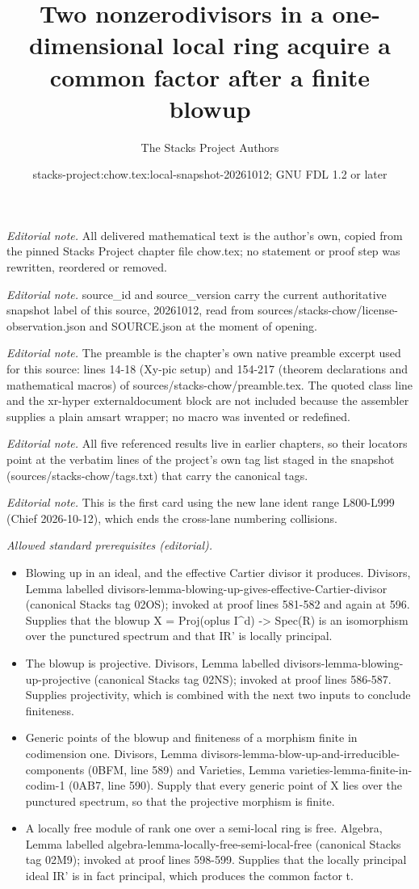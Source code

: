 \documentclass[10pt,a4paper]{amsart}
\title{Two nonzerodivisors in a one-dimensional local ring acquire a common factor after a finite blowup}
\author{The Stacks Project Authors}
\date{stacks-project:chow.tex:local-snapshot-20261012; GNU FDL 1.2 or later}
\theoremstyle{plain}
\theoremstyle{definition}
\theoremstyle{remark}
\numberwithin{equation}{subsection}
\begin{document}
\maketitle
\noindent\textit{Editorial note.} All delivered mathematical text is the author's own, copied from the pinned Stacks Project chapter file chow.tex; no statement or proof step was rewritten, reordered or removed.\par\medskip
\noindent\textit{Editorial note.} source\_id and source\_version carry the current authoritative snapshot label of this source, 20261012, read from sources/stacks-chow/license-observation.json and SOURCE.json at the moment of opening.\par\medskip
\noindent\textit{Editorial note.} The preamble is the chapter's own native preamble excerpt used for this source: lines 14-18 (Xy-pic setup) and 154-217 (theorem declarations and mathematical macros) of sources/stacks-chow/preamble.tex. The quoted class line and the xr-hyper externaldocument block are not included because the assembler supplies a plain amsart wrapper; no macro was invented or redefined.\par\medskip
\noindent\textit{Editorial note.} All five referenced results live in earlier chapters, so their locators point at the verbatim lines of the project's own tag list staged in the snapshot (sources/stacks-chow/tags.txt) that carry the canonical tags.\par\medskip
\noindent\textit{Editorial note.} This is the first card using the new lane ident range L800-L999 (Chief 2026-10-12), which ends the cross-lane numbering collisions.\par\medskip
\noindent\textit{Allowed standard prerequisites (editorial).}\begin{itemize}
\item Blowing up in an ideal, and the effective Cartier divisor it produces. Divisors, Lemma labelled divisors-lemma-blowing-up-gives-effective-Cartier-divisor (canonical Stacks tag 02OS); invoked at proof lines 581-582 and again at 596. Supplies that the blowup X = Proj(oplus I\textasciicircum{}d) -> Spec(R) is an isomorphism over the punctured spectrum and that IR' is locally principal.
\item The blowup is projective. Divisors, Lemma labelled divisors-lemma-blowing-up-projective (canonical Stacks tag 02NS); invoked at proof lines 586-587. Supplies projectivity, which is combined with the next two inputs to conclude finiteness.
\item Generic points of the blowup and finiteness of a morphism finite in codimension one. Divisors, Lemma divisors-lemma-blow-up-and-irreducible-components (0BFM, line 589) and Varieties, Lemma varieties-lemma-finite-in-codim-1 (0AB7, line 590). Supply that every generic point of X lies over the punctured spectrum, so that the projective morphism is finite.
\item A locally free module of rank one over a semi-local ring is free. Algebra, Lemma labelled algebra-lemma-locally-free-semi-local-free (canonical Stacks tag 02M9); invoked at proof lines 598-599. Supplies that the locally principal ideal IR' is in fact principal, which produces the common factor t.
\end{itemize}\medskip
\end{document}
